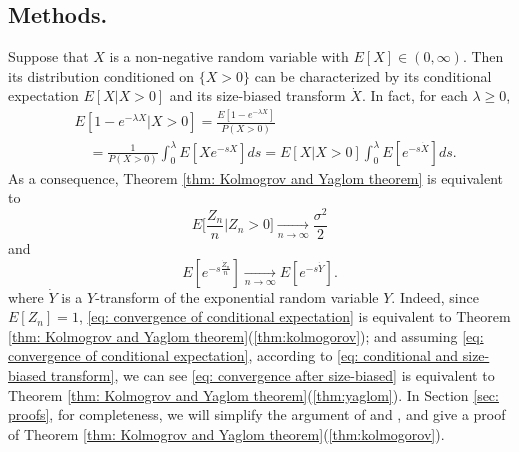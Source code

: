 \documentclass[12pt,a4paper]{amsart}
\numberwithin{equation}{section}
\begin{document}
\subsection{Methods.}
\label{sec: Methods}
	Suppose that $X$ is a non-negative random variable 
	with $E[X] \in (0,\infty)$.
	Then
	its distribution conditioned on $\{ X > 0\}$ can be characterized by its conditional expectation $E[X|X>0]$ and its size-biased transform $\dot X$.
	In fact, for each $\lambda \geq 0$,
\begin{equation}
\label{eq: conditional and size-biased transform}
\begin{split}
	&E[1-e^{-\lambda X}|X>0]
	= \frac{E[1-e^{-\lambda X}]}{P(X>0)}
	\\&\quad = \frac{1}{P(X>0)}\int_0^\lambda E[Xe^{-s X}]ds = E[X|X>0]\int_0^\lambda E[e^{-s \dot X}]ds.
\end{split}
\end{equation}
	As a consequence,  
	Theorem \ref{thm: Kolmogrov and Yaglom theorem}	is equivalent to
\begin{equation}
\label{eq: convergence of conditional expectation}
	E\big[\frac{Z_n}{n}| Z_n > 0\big]
	\xrightarrow[n\to \infty]{} \frac{\sigma^2}{2}
\end{equation}
	and
\[
\label{eq: convergence after size-biased}
	E[e^{-s \frac{\dot Z_n}{n}}]
	\xrightarrow[n\to \infty]{} E[e^{-s \dot Y}].
\]
	where $\dot Y$ is a $Y$-transform 
	of the exponential random variable $Y$.
	Indeed, since $E[Z_n] = 1$, \eqref{eq: convergence of conditional expectation} is equivalent to Theorem \ref{thm: Kolmogrov and Yaglom theorem}(\ref{thm:kolmogorov}); 
and assuming \eqref{eq: convergence of conditional expectation}, 
	according to \eqref{eq: conditional and size-biased transform}, we can see \eqref{eq: convergence after size-biased} is equivalent to Theorem \ref{thm: Kolmogrov and Yaglom theorem}(\ref{thm:yaglom}).
	In Section \ref{sec: proofs}, for completeness, we will simplify 
	the argument of \cite{geiger1999elementary} and \cite{VD},
	and give a proof of Theorem \ref{thm: Kolmogrov and Yaglom theorem}(\ref{thm:kolmogorov}).
\end{document}
